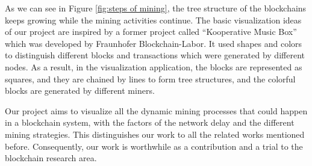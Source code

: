 As we can see in Figure \ref{fig:steps of mining}, the tree structure of the blockchains keeps growing while the mining activities continue. The basic visualization ideas of our project are inspired by a former project called “Kooperative Music Box” \cite{musicbox} which was developed by Fraunhofer Blockchain-Labor. It used shapes and colors to distinguish different blocks and transactions which were generated by different nodes. As a result, in the visualization application, the blocks are represented as squares, and they are chained by lines to form tree structures, and the colorful blocks are generated by different miners.

Our project aims to visualize all the dynamic mining processes that could happen in a blockchain system, with the factors of the network delay and the different mining strategies. This distinguishes our work to all the related works mentioned before. Consequently, our work is worthwhile as a contribution and a trial to the blockchain research area.
